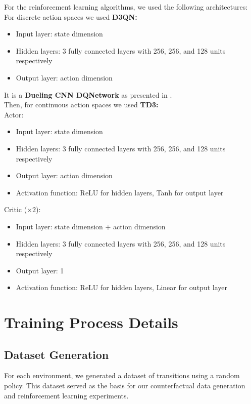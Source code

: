 For the reinforcement learning algorithms, we used the following architectures:\\
For discrete action spaces we used \textbf{D3QN:}
\begin{itemize}
    \item Input layer: state dimension
    \item Hidden layers: 3 fully connected layers with 256, 256, and 128 units respectively
    \item Output layer: action dimension
\end{itemize}
It is a \textbf{Dueling CNN DQNetwork} as presented in \cite{d3qn}.\\
Then, for continuous action spaces we used \textbf{TD3:}\\
Actor:
\begin{itemize}
    \item Input layer: state dimension
    \item Hidden layers: 3 fully connected layers with 256, 256, and 128 units respectively
    \item Output layer: action dimension
    \item Activation function: ReLU for hidden layers, Tanh for output layer
\end{itemize}
Critic ($\times 2$):
\begin{itemize}
    \item Input layer: state dimension + action dimension
    \item Hidden layers: 3 fully connected layers with 256, 256, and 128 units respectively
    \item Output layer: 1
    \item Activation function: ReLU for hidden layers, Linear for output layer
\end{itemize}

\section{Training Process Details}

\subsection{Dataset Generation}

For each environment, we generated a dataset of transitions using a random policy.
This dataset served as the basis for our counterfactual
data generation and reinforcement learning experiments.

